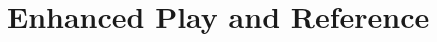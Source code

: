 \documentclass[12pt,oneside]{book}
\begin{document}
\part{Enhanced Play and Reference}
\clearpage


\appendix
\clearpage

\backmatter
\printindex
\end{document}
